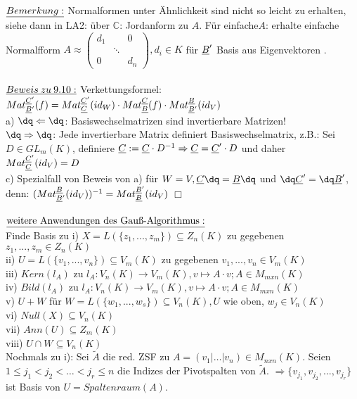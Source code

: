 \documentclass[fleqn, a4paper, 11pt]{scrartcl}
\newcommand{\CC}{\mathbb{C}}
\theoremstyle{definition}
\begin{document}
$\uline{Bemerkung:}$ Normalformen unter Ähnlichkeit sind nicht so leicht zu erhalten, siehe dann in LA2: über $\CC$: Jordanform zu $A$. Für \dq einfache\dq $A$: erhalte \dq einfache \dq Normalfform $A\approx\begin{pmatrix}
	d_1 & & 0\\
	 & \ddots & \\
	 0 & & d_n
\end{pmatrix}, d_i\in K$ für $\uline{B}'$ Basis aus \dq Eigenvektoren \dq.\\
\\
$\uline{Beweis\:zu\:9.10:}$ Verkettungsformel: $Mat_{\uline{B}'}^{\uline{C}'}(f)=Mat_{\uline{C}}^{\uline{C}'}(id_W)\cdot Mat_{\uline{B}}^{\uline{C}}(f)\cdot Mat_{\uline{B}'}^{\uline{B}}(id_V)$\\
a) $\dq\Leftarrow\dq$: Basiswechselmatrizen sind invertierbare Matrizen!\\
$\dq\Rightarrow\dq$: Jede invertierbare Matrix definiert Basiswechselmatrix, z.B.: Sei $D\in GL_m(K)$, definiere $\uline{C}:=\uline{C}\cdot D^{-1}\Rightarrow \uline{C}=\uline{C}'\cdot D$ und daher $Mat_{\uline{C}}^{\uline{C}'}(id_V)=D$\\
c) Spezialfall von Beweis von a) für $W=V, \uline{C}\dq =\uline{B}\dq$ und $\dq\uline{C}'=\dq \uline{B}'$, denn: $(Mat_{\uline{B}'}^{\uline{B}}(id_V))^{-1} =Mat_{\uline{B}}^{\uline{B}'}(id_V)$ \hfill $\Box$\\
\\
$\uline{\text{weitere Anwendungen des Gauß-Algorithmus}:}$\\
Finde Basis zu i) $X=L(\{z_1,...,z_m\})\subseteq Z_n(K)$ zu gegebenen $z_1,...,z_m\in Z_n(K)$\\
ii) $U=L(\{v_1,...,v_n\})\subseteq V_m(K)$ zu gegebenen $v_1,...,v_n\in V_m(K)$\\
iii) $Kern(l_A)$ zu $l_A:V_n(K)\rightarrow V_m(K),v\mapsto A\cdot v; A\in M_{mxn}(K)$\\
iv) $Bild(l_A)$ zu $l_A:V_n(K)\rightarrow V_m(K),v\mapsto A\cdot v; A\in M_{mxn}(K)$ \\
v) $U+W$ für $W=L(\{w_1,...,w_s\})\subseteq V_n(K),U$ wie oben, $w_j\in V_n(K)$\\
vi) $Null(X)\subseteq V_n(K)$\\
vii) $Ann(U)\subseteq Z_m(K)$\\
viii) $U\cap W\subseteq V_n(K)$\\
Nochmals zu i): Sei $\tilde{A}$ die red. ZSF zu $A=(v_1|\dots|v_n)\in M_{nxn}(K)$. Seien $1\leq j_1 < j_2 < \dots < j_r \leq n$ die Indizes der Pivotspalten von $\tilde{A}$. $\Rightarrow \{v_{j_1},v_{j_2},...,v_{j_r}\}$ ist Basis von $U= Spaltenraum(A)$.\\
\\
\newpage
\end{document}
